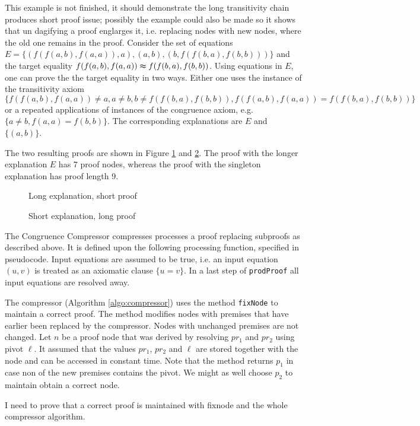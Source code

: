 \begin{example}
{\color{blue} This example is not finished, it should demonstrate the long transitivity chain produces short proof issue; possibly the example could also be made so it shows that un dagifying a proof englarges it, i.e. replacing nodes with new nodes, where the old one remains in the proof.}
Consider the set of equations $E = \{(f(f(a,b),f(a,a)),a),(a,b),(b,f(f(b,a),f(b,b)))\}$ and the target equality $f(f(a,b),f(a,a)) \thickapprox f(f(b,a),f(b,b))$.
Using equations in $E$, one can prove the the target equality in two ways.
Either one uses the instance of the transitivity axiom $\{f(f(a,b),f(a,a)) \neq a, a \neq b, b \neq f(f(b,a),f(b,b)), f(f(a,b),f(a,a)) = f(f(b,a),f(b,b))\}$ or a repeated applications of instances of the congruence axiom, e.g. $\{a \neq b, f(a,a) = f(b,b)\}$.
The corresponding explanations are $E$ and $\{(a,b)\}$.

The two resulting proofs are shown in Figure \ref{fig:short_expl_proof_1} and \ref{fig:short_expl_proof_2}.
The proof with the longer explanation $E$ has 7 proof nodes, whereas the proof with the singleton explanation has proof length 9.

\begin{figure}[!h]

\caption{Long explanation, short proof}
\label{fig:short_expl_proof_1}
\end{figure}

\begin{figure}[!h]

\caption{Short explanation, long proof}
\label{fig:short_expl_proof_2}
\end{figure}

\end{example}



The Congruence Compressor compresses processes a proof replacing subproofs as described above. It is defined upon the following processing function, specified in pseudocode.
Input equations are assumed to be true, i.e. an input equation $(u,v)$ is treated as an axiomatic clause $\{u = v\}$.
In a last step of \texttt{prodProof} all input equations are resolved away.



The compressor (Algorithm \ref{algo:compressor}) uses the method \texttt{fixNode} to maintain a correct proof.
The method modifies nodes with premises that have earlier been replaced by the compressor. 
Nodes with unchanged premises are not changed.
Let $n$ be a proof node that was derived by resolving $pr_1$ and $pr_2$ using pivot $\ell$.
It assumed that the values $pr_1$, $pr_2$ and $\ell$ are stored together with the node and can be accessed in constant time.
Note that the method returns $p_1$ in case non of the new premises contains the pivot.
We might as well choose $p_2$ to maintain obtain a correct node.



{\color{blue} I need to prove that a correct proof is maintained with fixnode and the whole compressor algorithm.}

\FloatBarrier
